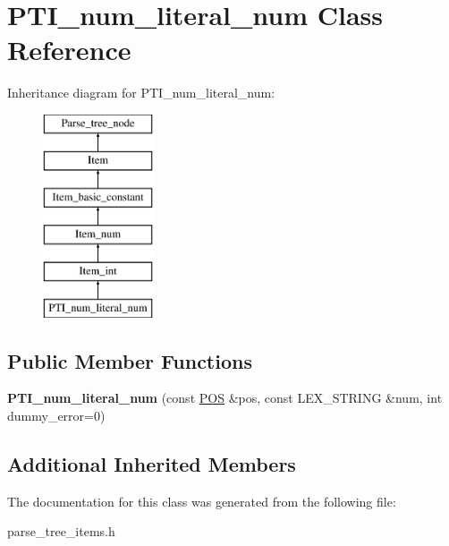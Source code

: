 \hypertarget{classPTI__num__literal__num}{}\section{P\+T\+I\+\_\+num\+\_\+literal\+\_\+num Class Reference}
\label{classPTI__num__literal__num}
Inheritance diagram for P\+T\+I\+\_\+num\+\_\+literal\+\_\+num\+:\begin{figure}[H]
\begin{center}
\leavevmode
\includegraphics[height=6.000000cm]{classPTI__num__literal__num}
\end{center}
\end{figure}
\subsection*{Public Member Functions}
\begin{DoxyCompactItemize}
\item 
\mbox{\label{classPTI__num__literal__num_a9bbd4d01fa3b4038ed9393289bc0ca9c}} 
{\bfseries P\+T\+I\+\_\+num\+\_\+literal\+\_\+num} (const \mbox{\hyperlink{structYYLTYPE}{P\+OS}} \&pos, const L\+E\+X\+\_\+\+S\+T\+R\+I\+NG \&num, int dummy\+\_\+error=0)
\end{DoxyCompactItemize}
\subsection*{Additional Inherited Members}


The documentation for this class was generated from the following file\+:\begin{DoxyCompactItemize}
\item 
parse\+\_\+tree\+\_\+items.\+h\end{DoxyCompactItemize}
